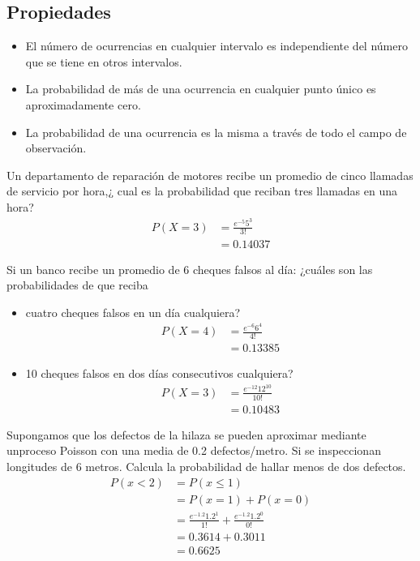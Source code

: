 \subsection{Propiedades}
\begin{itemize}
    \item El número de ocurrencias en cualquier intervalo es independiente del número que se tiene en otros intervalos.
    \item La probabilidad de más de una ocurrencia en cualquier punto único es aproximadamente cero.
    \item La probabilidad de una ocurrencia es la misma a través de todo el campo de observación.
\end{itemize}
\begin{ejemplo}
    Un departamento de reparación de motores recibe un promedio de cinco llamadas de servicio por hora,¿ cual es la probabilidad que reciban tres llamadas en una hora?
    \begin{align*}
        P(X=3) & = \frac{e^{-5}5^3}{3!} \\
               & = 0.14037
    \end{align*}
\end{ejemplo}
\begin{ejemplo}
    Si un banco recibe un promedio de 6 cheques falsos al día: ¿cuáles son las probabilidades de que reciba
    \begin{itemize}
        \item cuatro cheques falsos en un día cualquiera?
              \begin{align*}
                  P(X=4) & = \frac{e^{-6}6^4}{4!} \\
                         & = 0.13385
              \end{align*}
        \item 10 cheques falsos en dos días consecutivos cualquiera?
              \begin{align*}
                  P(X=3) & = \frac{e^{-12}12^10}{10!} \\
                         & = 0.10483
              \end{align*}
    \end{itemize}
\end{ejemplo}
\begin{ejemplo}
    Supongamos que los defectos de la hilaza se pueden aproximar mediante unproceso Poisson con una media de 0.2 defectos/metro. Si se inspeccionan longitudes de 6 metros. Calcula la probabilidad de hallar menos de dos defectos.
    \begin{align*}
        P(x<2) & =P(x\leq 1)                                        \\
               & = P(x=1)+P(x=0)                                    \\
               & =\frac{e^{-1.2}1.2^1}{1!}+\frac{e^{-1.2}1.2^0}{0!} \\
               & =0.3614+0.3011                                     \\
               & = 0.6625
    \end{align*}
\end{ejemplo}
